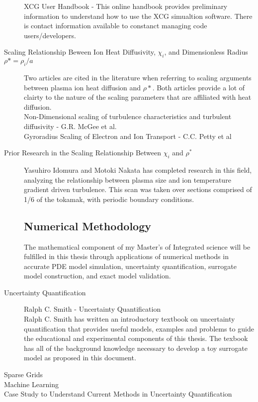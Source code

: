 \documentclass{article}
\begin{document}
\begin{description}
	XCG User Handbook - This online handbook provides preliminary information to understand how to use the XCG simualtion software. There is contact information available to constanct managing code users/developers.

\item[Scaling Relationship Beween Ion Heat Diffusivity, $\chi_i$, and Dimensionless Radius $\rho* = \rho_i/a$]\hfill

Two articles are cited in the literature when referring to scaling arguments between plasma ion heat diffusion and $\rho*$. Both articles provide a lot of clairty to the nature of the scaling parameters that are affiliated with heat diffusion.\\
Non-Dimensional scaling of turbulence characteristics and turbulent diffusivity - G.R. McGee et al.\\
Gyroradius Scaling of Electron and Ion Transport - C.C. Petty et al\\

\item[Prior Research in the Scaling Relationship Between $\chi_i$ and $\rho^*$]\hfill
Yasuhiro Idomura and Motoki Nakata has completed research in this field, analyzing the relationship between plasma size and ion temperature gradient driven turbulence. This scan was taken over sections comprised of 1/6 of the tokamak, with periodic boundary conditions. 

\subsection*{Numerical Methodology}
The mathematical component of my Master's of Integrated science will be fulfilled in this thesis through applications of numerical methods in accurate PDE model simulation, uncertainty quantification, surrogate model construction, and exact model validation.
\item[Uncertainty Quantification] \hfill

Ralph C. Smith - Uncertainty Quantification\\
Ralph C. Smith has written an introductory textbook on uncertainty quantification that provides useful models, examples and problems to guide the educational and experimental components of this thesis. The texbook has all of the background knowledge necessary to develop a toy surrogate model as proposed in this document.\\  

\item[Sparse Grids]
\item[Machine Learning]
\item[Case Study to Understand Current Methods in Uncertainty Quantification]\hfill


\end{description}
\end{document}
